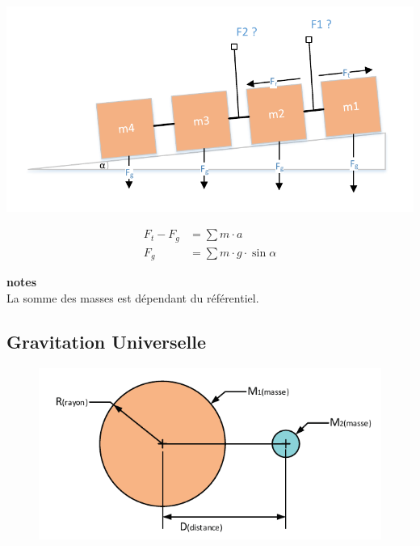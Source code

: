 \documentclass[12pt,a4paper]{article} %
\begin{document}
\begin{twocols}[0.5][0.5]
	\includegraphics[width=1\textwidth]{Newton-Traction}
\nextcol

	\begin{align*}
		F_t - F_g &= \sum m \cdot a \\
			F_g &= \sum m \cdot g \cdot \sin \alpha
	\end{align*}

	{\small
		\textbf{notes} \\
		La somme des masses est dépendant du référentiel.
	}

\end{twocols}

\newpage

\subsection{Gravitation Universelle}

	\begin{figure}[h]
		\centering
		\includegraphics{Newton-Gravitation-1Planete}
	\end{figure}
\end{document}
